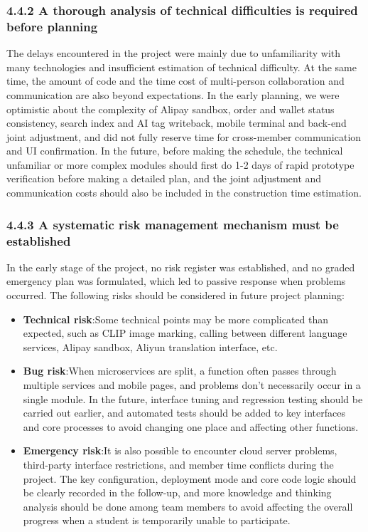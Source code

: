 \documentclass{article}
\begin{document}
\subsubsection{4.4.2 A thorough analysis of technical difficulties is required before planning}

The delays encountered in the project were mainly due to unfamiliarity with many technologies and insufficient estimation of technical difficulty. At the same time, the amount of code and the time cost of multi-person collaboration and communication are also beyond expectations. In the early planning, we were optimistic about the complexity of Alipay sandbox, order and wallet status consistency, search index and AI tag writeback, mobile terminal and back-end joint adjustment, and did not fully reserve time for cross-member communication and UI confirmation. In the future, before making the schedule, the technical unfamiliar or more complex modules should first do 1-2 days of rapid prototype verification before making a detailed plan, and the joint adjustment and communication costs should also be included in the construction time estimation.

\subsubsection{4.4.3 A systematic risk management mechanism must be established}

In the early stage of the project, no risk register was established, and no graded emergency plan was formulated, which led to passive response when problems occurred. The following risks should be considered in future project planning:

\begin{itemize}
    \item \textbf{Technical risk}:Some technical points may be more complicated than expected, such as CLIP image marking, calling between different language services, Alipay sandbox, Aliyun translation interface, etc.
    \item \textbf{Bug risk}:When microservices are split, a function often passes through multiple services and mobile pages, and problems don't necessarily occur in a single module. In the future, interface tuning and regression testing should be carried out earlier, and automated tests should be added to key interfaces and core processes to avoid changing one place and affecting other functions.
    \item \textbf{Emergency risk}:It is also possible to encounter cloud server problems, third-party interface restrictions, and member time conflicts during the project. The key configuration, deployment mode and core code logic should be clearly recorded in the follow-up, and more knowledge and thinking analysis should be done among team members to avoid affecting the overall progress when a student is temporarily unable to participate.
\end{itemize}
\end{document}
